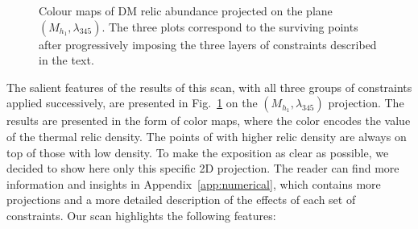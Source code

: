 \documentclass[12pt,a4paper]{article}
\begin{document}
\begin{figure}[tbh]
\begin{center}
\caption{Colour maps of DM relic abundance projected on the plane $(M_{h_1},\lambda_{345})$. The three plots correspond to the surviving points after progressively imposing the three layers of constraints described in the text. \label{fig:scan-simplified}} 
\end{center}
\end{figure}

The salient features of the results of this scan,
with all three groups of constraints applied successively, 
are presented in Fig.~\ref{fig:scan-simplified} on the $(M_{h_1},\lambda_{345})$ projection.
The results are presented in the form of color maps, where the color encodes the value of the thermal relic density. The points of with higher relic density are always  on top of those with low density.
To make the exposition as clear as possible, we decided to show here only this specific 2D projection. 
The reader can find more information and insights in Appendix~\ref{app:numerical}, which contains more projections and a more detailed description of the effects of each set of constraints.
Our scan highlights the following features:
\end{document}

